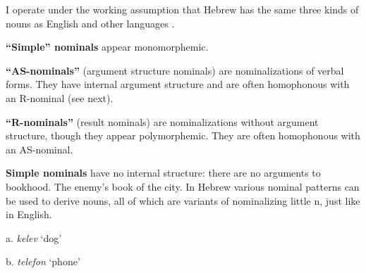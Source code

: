 I operate under the working assumption that Hebrew has the same three kinds of nouns as English and other languages \citep{grimshaw90,alexiadou10b,borer14lingua}.
	\begin{itemize*}
	\item \textbf{``Simple'' nominals} appear monomorphemic.
	\item \textbf{``AS-nominals''} (argument structure nominals) are nominalizations of verbal forms. They have internal argument structure and are often homophonous with an R-nominal (see next).
	\item \textbf{``R-nominals''} (result nominals) are nominalizations without argument structure, though they appear polymorphemic. They are often homophonous with an AS-nominal.
	\end{itemize*}

\textbf{Simple nominals} have no internal structure: there are no arguments to bookhood.
\ex \ljudge{*} The enemy's book of the city.
\xe
In Hebrew various nominal patterns can be used to derive nouns, all of which are variants of nominalizing little n, just like in English.
\ex
	\begin{minipage}[t]{0.3\textwidth}
		a. \emph{kelev} `dog'\\
	\end{minipage}
	\begin{minipage}[t]{0.3\textwidth}
		b. \emph{telefon} `phone'\\
	\end{minipage}
\xe


